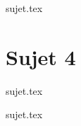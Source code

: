 \documentclass[a4paper, 11pt]{book}
\begin{document}
{sujet.tex}

\resetQ
\newpage

\chapter{Sujet 4}

{sujet.tex}

\resetQ
{sujet.tex}
\end{document}
